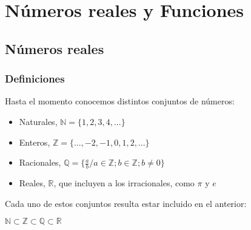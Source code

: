 \documentclass[Análisis.root.tex]{subfiles}
\newcommand{\N}{\mathbb{N}}
\newcommand{\Z}{\mathbb{Z}}
\newcommand{\Q}{\mathbb{Q}}
\newcommand{\R}{\mathbb{R}}
\begin{document}
    \section{Números reales y Funciones}
    \subsection{Números reales}
        \subsubsection{Definiciones}
        Hasta el momento conocemos distintos conjuntos de números:
        \begin{itemize}
            \item Naturales, \(\N = \{1,2,3,4,...\}\)
            \item Enteros, \(\Z = \{...,-2,-1,0,1,2,...\}\)
            \item Racionales, \(\Q = \{\frac{a}{b} / a \in \Z; b \in \Z;b \ne 0\}\)
            \item Reales, \(\R\), que incluyen a los irracionales, como \(\pi\) y \(e\)
        \end{itemize}
        Cada uno de estos conjuntos resulta estar incluido en el anterior:
        \begin{center}
            \(\N \subset \Z \subset \Q \subset \R\)
        \end{center}
        \begin{center}
        \end{center}
\end{document}
